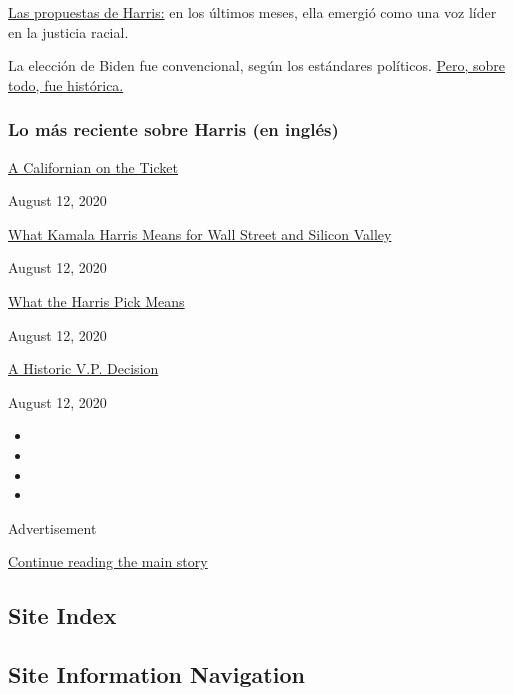 \href{https://www.nytimes3xbfgragh.onion/2020/08/11/us/politics/kamala-harris-issues-policy-positions.html}{Las
propuestas de Harris:} en los últimos meses, ella emergió como una voz
líder en la justicia racial.

La elección de Biden fue convencional, según los estándares políticos.
\href{https://www.nytimes3xbfgragh.onion/2020/08/11/us/politics/kamala-harris-joe-biden-running-mate.html}{Pero,
sobre todo, fue histórica.}

\hypertarget{lo-muxe1s-reciente-sobre-harris-en-ingluxe9s}{%
\subsubsection{Lo más reciente sobre Harris (en
inglés)}\label{lo-muxe1s-reciente-sobre-harris-en-ingluxe9s}}

\href{https://www.nytimes3xbfgragh.onion/2020/08/12/us/kamala-harris-vp-ca.html}{A
Californian on the Ticket}

August 12, 2020

\href{https://www.nytimes3xbfgragh.onion/2020/08/12/business/dealbook/kamala-harris-finance-tech.html}{What
Kamala Harris Means for Wall Street and Silicon Valley}

August 12, 2020

\href{https://www.nytimes3xbfgragh.onion/2020/08/12/us/politics/democrats-2020.html}{What
the Harris Pick Means}

August 12, 2020

\href{https://www.nytimes3xbfgragh.onion/2020/08/12/podcasts/the-daily/biden-kamala-harris-vp.html}{A
Historic V.P. Decision}

August 12, 2020

\begin{itemize}
\item
\item
\item
\item
\end{itemize}

Advertisement

\protect\hyperlink{after-bottom}{Continue reading the main story}

\hypertarget{site-index}{%
\subsection{Site Index}\label{site-index}}

\hypertarget{site-information-navigation}{%
\subsection{Site Information
Navigation}\label{site-information-navigation}}

